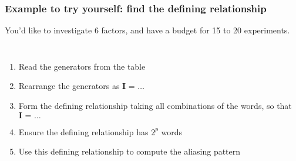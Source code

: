\documentclass[handout,11pt,aspectratio=169,mathserif]{beamer}
\begin{document}
\begin{frame}\frametitle{Example to try yourself: find the defining relationship}
	
	\vspace{0.5cm}
	You'd like to investigate 6 factors, and have a budget for 15 to 20 experiments.
	
	\vspace{0.5cm}
	\begin{columns}[T]
			\begin{enumerate}
				\item	Read the generators from the table 
				\item	Rearrange the generators as  $\textbf{I = \ldots}$
			 	\item	Form the {\color{purple}defining relationship} taking all combinations of the words, so that $\textbf{I = \ldots}$
			 	\item	Ensure the defining relationship has $2^p$ words
				\item	Use this defining relationship to compute the aliasing pattern
			\end{enumerate}
			

	\end{columns}

	
\end{frame}
\end{document}
